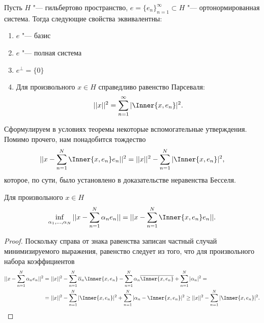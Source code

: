 \documentclass[main]{subfiles}
\begin{document}
\begin{theorem}
  Пусть \( H \) "--- гильбертово пространство,
  \( e = {\{ e_n \}}_{n = 1}^\infty \subset H \) "--- 
  ортонормированная система.
  Тогда следующие свойства эквивалентны:
  \begin{enumerate}
    \item \( e \) "--- базис
    \item \( e \) "--- полная система
    \item \( e^\perp = \{ 0 \} \)
    \item Для произвольного \( x \in H \) справедливо
      равенство Парсеваля:
      \[
	||x||^2 = \sum_{n=1}^\infty |\Inner{x, e_n}|^2.
      \]
  \end{enumerate}
\end{theorem}

Сформулируем в условиях теоремы некоторые вспомогательные утверждения.
Помимо прочего, нам понадобится тождество
\[
  ||x - \sum_{n = 1}^N \Inner{x, e_n} e_n||^2 =
  ||x||^2 - \sum_{n=1}^N |\Inner{x, e_n}|^2,
\]
которое, по сути, было установлено в доказательстве
неравенства Бесселя.

\begin{lemma}
  Для произвольного \( x \in H \)
  \[
    \inf_{\alpha_1, \dots, \alpha_N} ||x - \sum_{n = 1}^N \alpha_n e_n|| =
    ||x - \sum_{n = 1}^N \Inner{x, e_n} e_n||.
  \]
\end{lemma}
\begin{proof}
  Поскольку справа от знака равенства записан
  частный случай минимизируемого выражения,
  равенство следует из того, что
  для произвольного набора коэффициентов
  \begin{align}
    ||x - \sum_{n = 1}^N \alpha_n e_n||^2 &=
    ||x||^2 - \sum_{n = 1}^N \overline{\alpha}_n \Inner{x, e_n} -
    \sum_{n = 1}^N \alpha_n \overline{\Inner{x, e_n}} +
    \sum_{n = 1}^N |\alpha_n|^2 = \\
    &=
    ||x||^2 - \sum_{n = 1}^N |\Inner{x, e_n}|^2 +
    \sum_{n = 1}^N |\alpha_n - \Inner{x, e_n}|^2 \ge
    ||x||^2 - \sum_{n = 1}^N |\Inner{x, e_n}|^2. \qedhere
  \end{align}
\end{proof}
\end{document}
